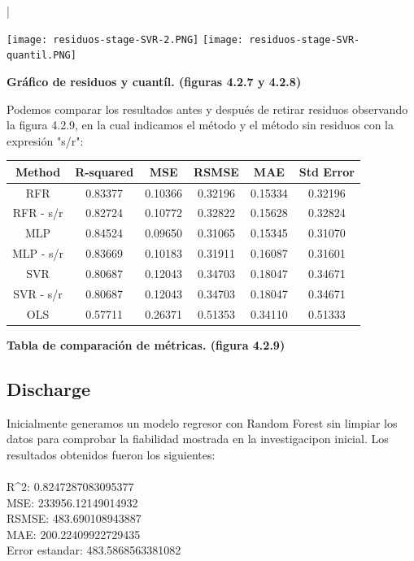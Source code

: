|\documentclass{article}
\begin{document}
        \texttt{[image: residuos-stage-SVR-2.PNG]} 
        \texttt{[image: residuos-stage-SVR-quantil.PNG]} \\
                \begin{center}
            \textbf{Gráfico de residuos y cuantíl. (figuras 4.2.7 y 4.2.8)}
        \end{center}

Podemos comparar los resultados antes y después de retirar residuos observando la figura 4.2.9, en la cual indicamos el método y el método sin residuos con la expresión "s/r":\\

\begin{tabular}{|c|c|c|c|c|c|}
    \hline
    Method  &   R-squared  & MSE & RSMSE & MAE & Std Error  \\
    \hline
    RFR & 0.83377 & 0.10366 & 0.32196 & 0.15334 &  0.32196\\
    \hline
    RFR - s/r  & 0.82724 & 0.10772 & 0.32822 & 0.15628 &  0.32824\\
    \hline
    MLP & 0.84524 & 0.09650 & 0.31065 & 0.15345 & 0.31070 \\
    \hline
    MLP - s/r & 0.83669 & 0.10183 & 0.31911 & 0.16087 & 0.31601 \\
    \hline
    SVR & 0.80687 & 0.12043 & 0.34703 & 0.18047 & 0.34671 \\
    \hline
    SVR - s/r & 0.80687 & 0.12043 & 0.34703 & 0.18047 & 0.34671 \\
    \hline
    OLS & 0.57711 & 0.26371 & 0.51353 & 0.34110 & 0.51333 \\
    \hline
\end{tabular}

\begin{center}
            \textbf{Tabla de comparación de métricas. (figura 4.2.9)}
\end{center}



\subsection{Discharge}

    Inicialmente generamos un modelo regresor con Random Forest sin limpiar los datos para comprobar la fiabilidad mostrada en la investigacipon inicial. Los resultados obtenidos fueron los siguientes:\\
    \\
    {R^2}:  0.8247287083095377\\
    MSE:  233956.12149014932\\
    RSMSE:  483.690108943887\\
    MAE:  200.22409922729435\\
    Error estandar:  483.5868563381082\\
\end{document}
